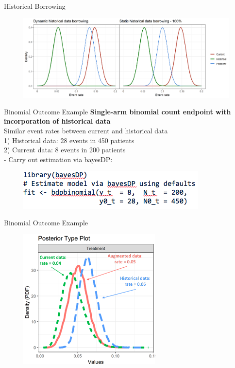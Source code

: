 \documentclass[12pt,t]{beamer}
\begin{document}
\begin{frame}{Historical Borrowing}
\begin{figure}
    \centerline{
\includegraphics[width=1.1\linewidth]{Images/dynamic.png}}
\end{figure}
\end{frame}





\begin{frame}{Binomial Outcome Example}
\textbf{Single-arm binomial count endpoint with incorporation of historical data}\\
Similar event rates between current and historical data \\
1) Historical data: 28 events in 450 patients \\
2) Current data: 8 events in 200 patients \\
- Carry out estimation via bayesDP:
\begin{figure}
\includegraphics[width=.9\linewidth]{Images/code.png}
\end{figure}

\end{frame}




\begin{frame}{Binomial Outcome Example}
\begin{figure}
\includegraphics[width=.70\linewidth]{Images/post.png}
\end{figure}
\end{frame}
\end{document}
